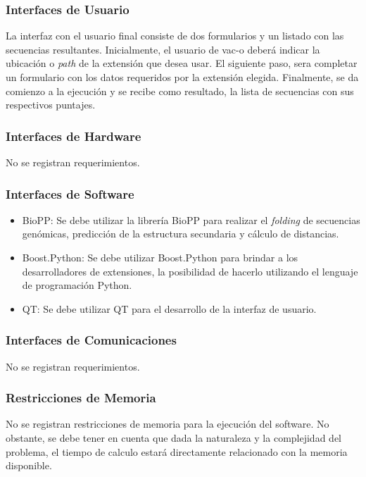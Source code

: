 \documentclass[10pt,a4paper]{article}
\begin{document}
    \subsubsection{Interfaces de Usuario}
    La interfaz con el usuario final consiste de dos formularios y un listado con las secuencias resultantes. Inicialmente, el usuario de vac-o deber\'a indicar la ubicaci\'on o \textit{path} de la extensi\'on que desea usar. El siguiente paso, sera completar un formulario con los datos requeridos por la extensi\'on elegida. Finalmente, se da comienzo a la ejecuci\'on y se recibe como resultado, la lista de secuencias con sus respectivos puntajes.

    \subsubsection{Interfaces de Hardware}
    No se registran requerimientos.

    \subsubsection{Interfaces de Software}
    \begin{itemize}
      \item BioPP: Se debe utilizar la librer\'ia BioPP para realizar el \textit{folding} de secuencias gen\'omicas, predicci\'on de la estructura secundaria y c\'alculo de distancias.
      \item Boost.Python: Se debe utilizar Boost.Python para brindar a los desarrolladores de extensiones, la posibilidad de hacerlo utilizando el lenguaje de programaci\'on Python.
      \item QT: Se debe utilizar QT para el desarrollo de la interfaz de usuario.
    \end{itemize}

    \subsubsection{Interfaces de Comunicaciones}
    No se registran requerimientos.

    \subsubsection{Restricciones de Memoria}
    No se registran restricciones de memoria para la ejecuci\'on del software. No obstante, se debe tener en cuenta que dada la naturaleza y la complejidad del problema, el tiempo de calculo estar\'a directamente relacionado con la memoria disponible.
\end{document}
